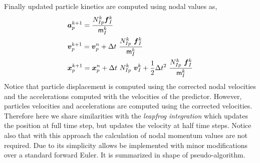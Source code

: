 Finally updated particle kinetics are computed using nodal values as,
\begin{align}
  \label{eq:Update-lagrangian-pce}
        &\vec{a}_p^{k+1} = \frac{N_{Ip}^k\vec{f}_{I}^{k}}{\tens{m}_I^k}\\
      &\vec{v}_p^{k+1} = \vec{v}_p^n + \Delta t\
        \frac{N_{Ip}^k\
        \vec{f}_{I}^{k}}{\tens{m}_I^k}\\
      &\vec{x}_p^{k+1} = \vec{x}_p^n + \Delta t\
         N_{Ip}^k\ \vec{v}_{I}^{k} +
        \frac{1}{2}\Delta t^2\ \frac{N_{Ip}^k\
        \vec{f}_{I}^{k}}{\tens{m}_I^k} 
\end{align}
Notice that particle displacement is computed using the corrected
nodal velocities and the accelerations computed with the velocities
of the predictor. However, particles velocities and accelerations
are computed using the corrected velocities. Therefore here we share similarities
with the \textit{leapfrog integration} which updates the position at
full time step, but updates the velocity at half time steps. Notice
also that with this approach the calculation of nodal momentum values
are not required. Due to its simplicity allows be implemented with minor modifications
over a standard forward Euler. It is summarized in shape of
pseudo-algorithm.

